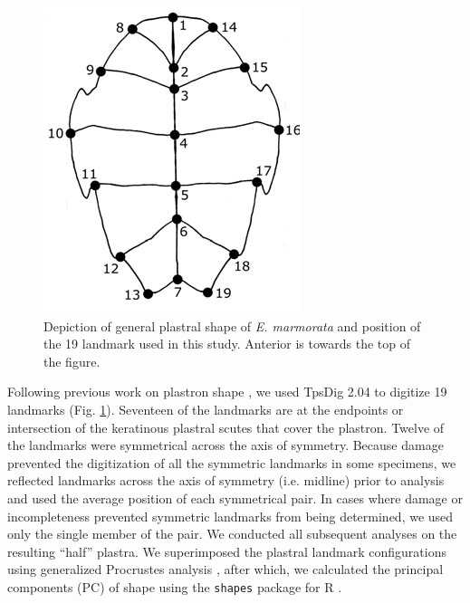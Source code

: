 \documentclass[12pt,letterpaper]{article}
\begin{document}
\begin{figure}[h]
  \centering
  \includegraphics[height = 0.5\textheight, width = \textwidth, keepaspectratio = true]{figure/plastra}
  \caption{Depiction of general plastral shape of \textit{E. marmorata} and position of the 19 landmark used in this study. Anterior is towards the top of the figure.}
  \label{fig:plastra}
\end{figure}


Following previous work on plastron shape \citep{Angielczyk2007,Angielczyk2011,Angielczyk2013a}, we used TpsDig 2.04 \citep{Rohlf2005} to digitize 19 landmarks (Fig. \ref{fig:plastra}). Seventeen of the landmarks are at the endpoints or intersection of the keratinous plastral scutes that cover the plastron. Twelve of the landmarks were symmetrical across the axis of symmetry. Because damage prevented the digitization of all the symmetric landmarks in some specimens, we reflected landmarks across the axis of symmetry (i.e. midline) prior to analysis and used the average position of each symmetrical pair. In cases where damage or incompleteness prevented symmetric landmarks from being determined, we used only the single member of the pair. We conducted all subsequent analyses on the resulting ``half'' plastra. We superimposed the plastral landmark configurations using generalized Procrustes analysis \citep{Dryden1998a}, after which, we calculated the principal components (PC) of shape using the \texttt{shapes} package for R \citep{2015,Dryden2013}.
\end{document}
